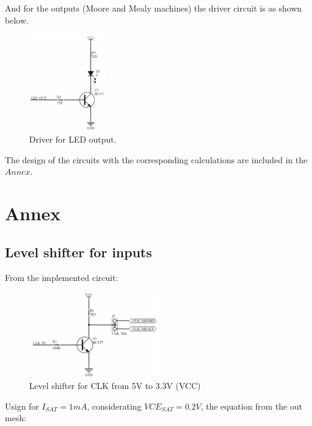 And for the outputs (Moore and Mealy machines) 
the driver circuit is as shown below.

\begin{figure}[H]
    \begin{centering}
    \includegraphics[width=0.3\textwidth]{Graficos3/LED_Driver.png}
    \par\end{centering}
    \caption{Driver for LED output.}
\end{figure}

The design of the circuits with the corresponding 
calculations are included in the $Annex$.

\newpage

\section*{Annex}
\subsection*{Level shifter for inputs}
From the implemented circuit:
\begin{figure}[H]
    \begin{centering}
    \includegraphics[width=0.5\textwidth]{Graficos3/CLK_Driver.png}
    \par\end{centering}
    \caption{Level shifter for CLK from 5V to 3.3V (VCC)}
\end{figure}

Usign for $I_{SAT} = 1mA$, considerating $VCE_{SAT} = 0.2V$, 
the equation from the out mesh:


